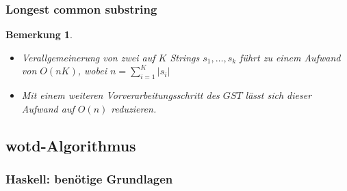 \documentclass{beamer}
\newtheorem{remark}{Bemerkung}
\newcommand{\abs}[1]{\left|#1\right|}
\begin{document}
\begin{frame}
\frametitle{Longest common substring}
\begin{remark}
    \begin{itemize}
        \item Verallgemeinerung von zwei auf $K$ Strings $s_1, \dots, s_k$ führt zu einem Aufwand von $O(nK)$, wobei $n = \sum_{i = 1}^K \abs{s_i}$
        \item Mit einem weiteren Vorverarbeitungsschritt des $GST$ lässt sich dieser Aufwand auf $O(n)$ reduzieren.
    \end{itemize}
\end{remark}
\end{frame}




\subsection{wotd-Algorithmus}

\subsubsection{Haskell: benötige Grundlagen}
\end{document}
